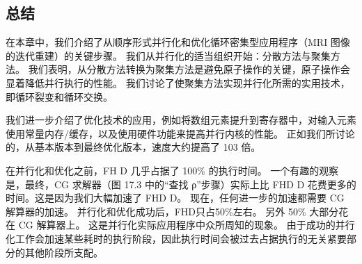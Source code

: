 \subsection{总结}
在本章中，我们介绍了从顺序形式并行化和优化循环密集型应用程序（MRI 图像的迭代重建）的关键步骤。 我们从并行化的适当组织开始：分散方法与聚集方法。 我们表明，从分散方法转换为聚集方法是避免原子操作的关键，原子操作会显着降低并行执行的性能。 我们讨论了使聚集方法实现并行化所需的实用技术，即循环裂变和循环交换。

我们进一步介绍了优化技术的应用，例如将数组元素提升到寄存器中，对输入元素使用常量内存/缓存，以及使用硬件功能来提高并行内核的性能。 正如我们所讨论的，从基本版本到最终优化版本，速度大约提高了 103 倍。

在并行化和优化之前，FH D 几乎占据了 100\% 的执行时间。 一个有趣的观察是，最终，CG 求解器（图 17.3 中的“查找 ρ”步骤）实际上比 FHD D 花费更多的时间。这是因为我们大幅加速了 FHD D。 现在，任何进一步的加速都需要 CG 解算器的加速。 并行化和优化成功后，FHD只占50\%左右。 另外 50\% 大部分花在 CG 解算器上。 这是并行化实际应用程序中众所周知的现象。 由于成功的并行化工作会加速某些耗时的执行阶段，因此执行时间会被过去占据执行的无关紧要部分的其他阶段所支配。




